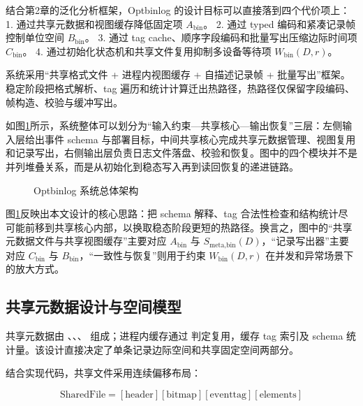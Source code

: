 结合第2章的泛化分析框架，Optbinlog 的设计目标可以直接落到四个代价项上： 1. 通过共享元数据和视图缓存降低固定项 \(A_{\text{bin}}\)。 2. 通过 typed 编码和紧凑记录帧控制单位空间 \(B_{\text{bin}}\)。 3. 通过 tag cache、顺序字段编码和批量写出压缩边际时间项 \(C_{\text{bin}}\)。 4. 通过初始化状态机和共享文件复用抑制多设备等待项 \(W_{\text{bin}}(D,r)\)。

系统采用``共享格式文件 + 进程内视图缓存 + 自描述记录帧 + 批量写出''框架。稳定阶段把格式解析、tag 遍历和统计计算迁出热路径，热路径仅保留字段编码、帧构造、校验与缓冲写出。

如图\ref{fig:optbinlog-design-overview}所示，系统整体可以划分为``输入约束---共享核心---输出恢复''三层：左侧输入层给出事件 schema 与部署目标，中间共享核心完成共享元数据管理、视图复用和记录写出，右侧输出层负责日志文件落盘、校验和恢复。图中的四个模块并不是并列堆叠关系，而是从初始化到稳态写入再到读回恢复的递进链路。

\begin{figure}[H]
\centering

\caption{Optbinlog 系统总体架构}
\label{fig:optbinlog-design-overview}
\end{figure}

图\ref{fig:optbinlog-design-overview}反映出本文设计的核心思路：把 schema 解释、tag 合法性检查和结构统计尽可能前移到共享核心内部，以换取稳态阶段更短的热路径。换言之，图中的``共享元数据文件与共享视图缓存''主要对应 \(A_{\text{bin}}\) 与 \(S_{\text{meta},\text{bin}}(D)\)，``记录写出器''主要对应 \(C_{\text{bin}}\) 与 \(B_{\text{bin}}\)，``一致性与恢复''则用于约束 \(W_{\text{bin}}(D,r)\) 在并发和异常场景下的放大方式。

\subsection{共享元数据设计与空间模型}\label{ux5171ux4eabux5143ux6570ux636eux8bbeux8ba1ux4e0eux7a7aux95f4ux6a21ux578b}

共享元数据由 、、、 组成；进程内缓存通过  判定复用，缓存 tag 索引及 schema 统计量。该设计直接决定了单条记录边际空间和共享固定空间两部分。

结合实现代码，共享文件采用连续偏移布局：

\[
\text{SharedFile}=[\text{header}][\text{bitmap}][\text{eventtag}][\text{elements}]
\]

